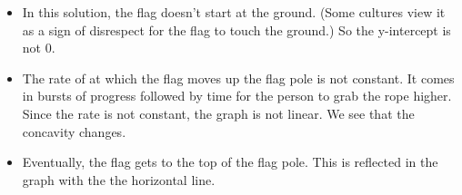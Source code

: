 \documentclass[10pt]{article}
\begin{document}
\begin{enumerate}[leftmargin=*]
\begin{solution}
\begin{tikzpicture}
\end{tikzpicture}

\begin{itemize}
\item In this solution, the flag doesn't start at the ground. (Some cultures view it as a sign of disrespect for the flag to touch the ground.) So the y-intercept is not 0. 

\item The rate of at which the flag moves up the flag pole is not constant. It comes in bursts of progress followed by time for the person to grab the rope higher. Since the rate is not constant, the graph is not linear. We see that the concavity changes. 

\item Eventually, the flag gets to the top of the flag pole. This is reflected in the graph with the the horizontal line.
\end{itemize} 
\end{solution} 
\end{enumerate}
\end{document}
